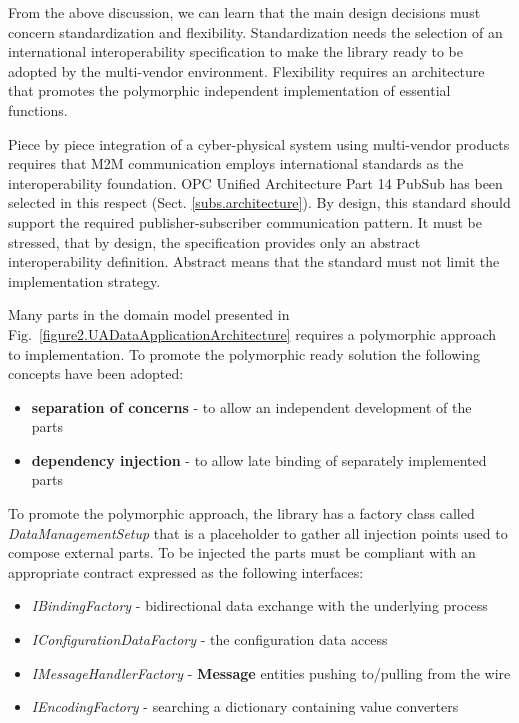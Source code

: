 \documentclass{article}
\begin{document}
From the above discussion, we can learn that the main design decisions must concern standardization and flexibility. Standardization needs the selection of an international interoperability specification to make the library ready to be adopted by the multi-vendor environment. Flexibility requires an architecture that promotes the polymorphic independent implementation of essential functions.

Piece by piece integration of a cyber-physical system using multi-vendor products requires that M2M communication employs international standards as the interoperability foundation. OPC Unified Architecture Part 14 PubSub has been selected in this respect (Sect. \ref{subs.architecture}). By design, this standard should support the required publisher-subscriber communication pattern. It must be stressed, that by design, the specification provides only an abstract interoperability definition. Abstract means that the standard must not limit the implementation strategy.

Many parts in the domain model presented in Fig.~\ref{figure2.UADataApplicationArchitecture} requires a polymorphic approach to implementation. To promote the polymorphic ready solution the following concepts have been adopted:

\begin{itemize}
      \item \textbf{separation of concerns} - to allow an independent development of the parts~\cite{RefWorks:doc:5d92609be4b02eb43d372bd1}
      \item \textbf{dependency injection} - to allow late binding of separately implemented parts~\cite{RefWorks:doc:5d925b77e4b030b4e0596f5d}
\end{itemize}

To promote the polymorphic approach, the library has a factory class called \emph{DataManagementSetup} that is a placeholder to gather all injection points used to compose external parts. To be injected the parts must be compliant with an appropriate contract expressed as the following interfaces:

\begin{itemize}
      \item \emph{IBindingFactory} - bidirectional data exchange with the underlying process
      \item \emph{IConfigurationDataFactory} - the configuration data access
      \item \emph{IMessageHandlerFactory} - \textbf{Message} entities pushing to/pulling from the wire
      \item \emph{IEncodingFactory} - searching a dictionary containing value converters
\end{itemize}
\end{document}
